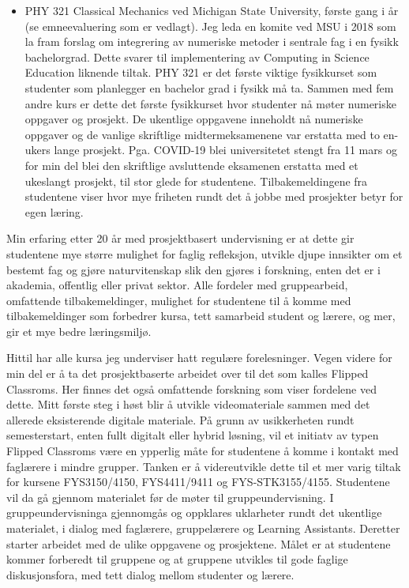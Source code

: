 \documentclass[aps,floatfix,preprint]{revtex4-1}
\begin{document}
\begin{itemize}
\item PHY 321 Classical Mechanics ved Michigan State University, første gang i år (se emneevaluering som er vedlagt). Jeg leda en komite ved MSU i 2018 som la fram forslag om integrering av numeriske   metoder i sentrale fag i en fysikk bachelorgrad. Dette svarer til implementering av Computing in Science Education liknende tiltak. PHY 321 er det første viktige fysikkurset som studenter som planlegger en bachelor grad i fysikk må ta. Sammen med fem andre kurs er dette det første fysikkurset hvor studenter nå møter numeriske oppgaver og prosjekt.  De ukentlige oppgavene inneholdt nå numeriske oppgaver og de vanlige skriftlige midtermeksamenene var erstatta med to en-ukers lange prosjekt. Pga. COVID-19 blei universitetet stengt fra 11 mars og for min del blei den skriftlige avsluttende eksamenen erstatta med et ukeslangt prosjekt, til stor glede for studentene.
  Tilbakemeldingene fra studentene viser hvor mye friheten rundt det å jobbe med prosjekter betyr for egen læring.
  
\end{itemize}

Min erfaring etter 20 år med prosjektbasert undervisning er at dette
gir studentene mye større mulighet for faglig refleksjon, utvikle
djupe innsikter om et bestemt fag og gjøre naturvitenskap slik den
gjøres i forskning, enten det er i akademia, offentlig eller privat
sektor. Alle fordeler med gruppearbeid, omfattende tilbakemeldinger,
mulighet for studentene til å komme med tilbakemeldinger som forbedrer
kursa, tett samarbeid student og lærere, og mer, gir et mye bedre
læringsmiljø.

Hittil har alle kursa jeg underviser hatt regulære forelesninger.
Vegen videre for min del er å ta det prosjektbaserte arbeidet over
til det som kalles Flipped Classroms. Her finnes det også omfattende
forskning som viser fordelene ved dette. Mitt første steg i høst blir
å utvikle videomateriale sammen med det allerede eksisterende digitale
materiale. På grunn av usikkerheten rundt semesterstart, enten fullt
digitalt eller hybrid løsning, vil et initiatv av typen Flipped
Classroms være en ypperlig måte for studentene å komme i kontakt med
faglærere i mindre grupper.  Tanken er å videreutvikle dette til et
mer varig tiltak for kursene FYS3150/4150, FYS4411/9411 og
FYS-STK3155/4155. Studentene vil da gå gjennom materialet før de møter
til gruppeundervisning. I gruppeundervisninga gjennomgås og oppklares
uklarheter rundt det ukentlige materialet, i dialog med faglærere,
gruppelærere og Learning Assistants. Deretter starter arbeidet med de
ulike oppgavene og prosjektene. Målet er at studentene kommer
forberedt til gruppene og at gruppene utvikles til gode faglige
diskusjonsfora, med tett dialog mellom studenter og lærere.
\end{document}
